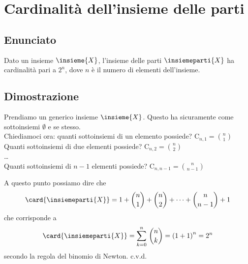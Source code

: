 \documentclass[../../dimostrazioni]{subfiles}
\begin{document}
    \chapter{Cardinalità dell'insieme delle parti}

        \section*{Enunciato}

            Dato un insieme \(\insieme{X}\), l'insieme delle parti \(\insiemeparti{X}\) ha cardinalità pari a \(2^n\), dove \(n\) è il numero di elementi dell'insieme.

        \section*{Dimostrazione}

            Prendiamo un generico insieme \(\insieme{X}\). Questo ha sicuramente come sottoinsiemi \(\emptyset\) e se stesso.\\
            Chiediamoci ora: quanti sottoinsiemi di un elemento possiede? \(\mathrm{C}_{n, 1} = \binom{n}{1}\)\\
            Quanti sottoinsiemi di due elementi possiede? \(\mathrm{C}_{n, 2} = \binom{n}{2}\)\\
            \dots\\
            Quanti sottoinsiemi di \(n - 1\) elementi possiede? \(\mathrm{C}_{n, n - 1} = \binom{n}{n - 1}\)

            A questo punto possiamo dire che
            \[
                \card{\insiemeparti{X}} = 1 + \binom{n}{1} + \binom{n}{2} + \dots + \binom{n}{n - 1} + 1
            \]
            che corrisponde a
            \[
                \card{\insiemeparti{X}} = \sum_{k = 0}^n \, \binom{n}{k} = {(1 + 1)}^n = 2^n
            \]
            secondo la regola del binomio di Newton. c.v.d.
    
\end{document}
